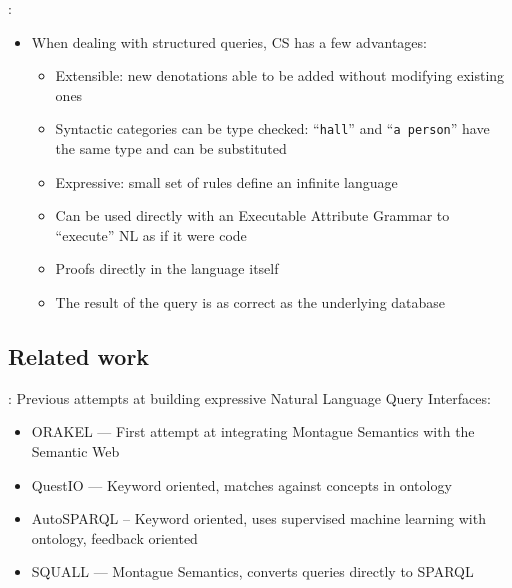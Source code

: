 \documentclass[logoontitle,tabu,supertabular,aspectratio=43]{preney-uwindsor-beamer}
\begin{document}
    \begin{frame}{\insertsection: \insertsubsection}
        \begin{itemize}
            \item When dealing with structured queries, CS has a few advantages:
            \begin{itemize}
                \item Extensible: new denotations able to be added without modifying existing ones
                \item Syntactic categories can be type checked: ``\texttt{hall}'' and ``\texttt{a person}'' have the same type and can be substituted
                \item Expressive: small set of rules define an infinite language
                \item Can be used directly with an Executable Attribute Grammar \cite{frost1989constructing} to ``execute'' NL as if it were code
                \item Proofs directly in the language itself
                \item The result of the query is as correct as the underlying database
            \end{itemize}
        \end{itemize}
    \end{frame}


\subsection{Related work}
\begin{frame}{\insertsection: \insertsubsection}
    Previous attempts at building expressive Natural Language Query Interfaces:
    \begin{itemize}
        \item ORAKEL\cite{cimiano2007orakel} --- First attempt at integrating Montague Semantics with the Semantic Web
        \item QuestIO\cite{tablan2008natural} --- Keyword oriented, matches against concepts in ontology
        \item AutoSPARQL\cite{lehmann2011autosparql} -- Keyword oriented, uses supervised machine learning with ontology, feedback oriented
        \item SQUALL\cite{ferre2014squall} --- Montague Semantics, converts queries directly to SPARQL
    \end{itemize}
\end{frame}
\end{document}
